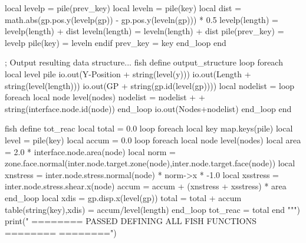 \documentclass[a4paper, nobind]{templates/ociamthesis}
\newenvironment{Shaded}{\begin{snugshade}}{\end{snugshade}}
\newcommand{\BuiltInTok}[1]{#1}
\newcommand{\NormalTok}[1]{#1}
\newcommand{\StringTok}[1]{\textcolor[rgb]{0.31,0.60,0.02}{#1}}
\renewenvironment{Shaded}
{
  \vspace{10pt}%
  \begin{snugshade}%
}{%
  \end{snugshade}%
  \vspace{8pt}%
}
\begin{document}
\begin{Shaded}
\begin{Highlighting}[]
\StringTok{            local levelp = pile(prev\_key)}
\StringTok{            local leveln = pile(key)}
\StringTok{            local dist = math.abs(gp.pos.y(levelp(\textquotesingle{}gp\textquotesingle{})) {-} gp.pos.y(leveln(\textquotesingle{}gp\textquotesingle{}))) * 0.5}
\StringTok{            levelp(\textquotesingle{}length\textquotesingle{}) = levelp(\textquotesingle{}length\textquotesingle{}) + dist}
\StringTok{            leveln(\textquotesingle{}length\textquotesingle{}) = leveln(\textquotesingle{}length\textquotesingle{}) + dist}
\StringTok{            pile(prev\_key) = levelp}
\StringTok{            pile(key) = leveln}
\StringTok{        endif}
\StringTok{        prev\_key = key}
\StringTok{    end\_loop}
\StringTok{end}

\StringTok{; Output resulting data structure...}
\StringTok{fish define output\_structure}
\StringTok{    loop foreach local level pile}
\StringTok{        io.out(\textquotesingle{}Y{-}Position \textquotesingle{} + string(level(\textquotesingle{}y\textquotesingle{})))}
\StringTok{        io.out(\textquotesingle{}Length \textquotesingle{} + string(level(\textquotesingle{}length\textquotesingle{})))}
\StringTok{        io.out(\textquotesingle{}GP \textquotesingle{} + string(gp.id(level(\textquotesingle{}gp\textquotesingle{}))))}
\StringTok{        local nodelist = \textquotesingle{}\textquotesingle{}}
\StringTok{        loop foreach local node level(\textquotesingle{}nodes\textquotesingle{})}
\StringTok{            nodelist = nodelist + \textquotesingle{} \textquotesingle{} + string(interface.node.id(node))}
\StringTok{        end\_loop}
\StringTok{        io.out(\textquotesingle{}Nodes\textquotesingle{}+nodelist)}
\StringTok{    end\_loop}
\StringTok{end}

\StringTok{fish define tot\_reac}
\StringTok{    local total = 0.0}
\StringTok{    loop foreach local key map.keys(pile)}
\StringTok{        local level = pile(key)}
\StringTok{        local accum = 0.0}
\StringTok{        loop foreach local node level(\textquotesingle{}nodes\textquotesingle{})}
\StringTok{            local area = 2.0 * interface.node.area(node)}
\StringTok{            local norm = zone.face.normal(inter.node.target.zone(node),inter.node.target.face(node))}
\StringTok{            local xnstress = inter.node.stress.normal(node) * norm{-}\textgreater{}x * {-}1.0}
\StringTok{            local xsstress = inter.node.stress.shear.x(node)}
\StringTok{            accum = accum + (xnstress + xsstress) *  area}
\StringTok{        end\_loop}
\StringTok{        local xdis = gp.disp.x(level(\textquotesingle{}gp\textquotesingle{}))}
\StringTok{        total = total + accum}
\StringTok{        table(string(key),xdis) = accum/level(\textquotesingle{}length\textquotesingle{})}
\StringTok{    end\_loop}
\StringTok{    tot\_reac = total}
\StringTok{end}
\StringTok{"""}\NormalTok{)}
\BuiltInTok{print}\NormalTok{(}\StringTok{"               ======== PASSED DEFINING ALL FISH FUNCTIONS ========        ========"}\NormalTok{)}
\end{Highlighting}
\end{Shaded}
\end{document}
